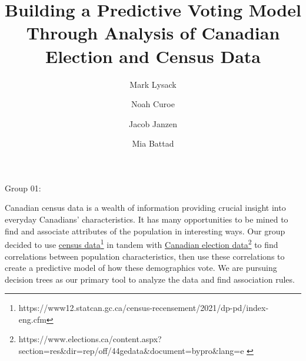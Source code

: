 \documentclass{article}
\title{Building a Predictive Voting Model Through Analysis of Canadian Election and Census Data}
\author{
    Mark Lysack\and
    Noah Curoe\and
    Jacob Janzen\and
    Mia Battad
}
\begin{document}
\maketitle
Group 01:

Canadian census data is a wealth of information providing crucial insight into everyday
Canadians' characteristics. It has many opportunities to be mined to find
and associate attributes of the population in interesting ways. Our group decided to use
\href{
https://www12.statcan.gc.ca/census-recensement/2021/dp-pd/index-eng.cfm
}{census data}\footnote{
https://www12.statcan.gc.ca/census-recensement/2021/dp-pd/index-eng.cfm
}
in tandem with
\href{
    https://www.elections.ca/content.aspx?section=res&dir=rep/off/44gedata&document=bypro&lang=e
}{Canadian election data}\footnote{\tiny{
    https://www.elections.ca/content.aspx?section=res\&dir=rep/off/44gedata\&document=bypro\&lang=e
}}
to find correlations between population characteristics, then use these correlations to
create a predictive model of how these demographics vote. We are pursuing decision
trees as our primary tool to analyze the data and find association rules.
\end{document}
